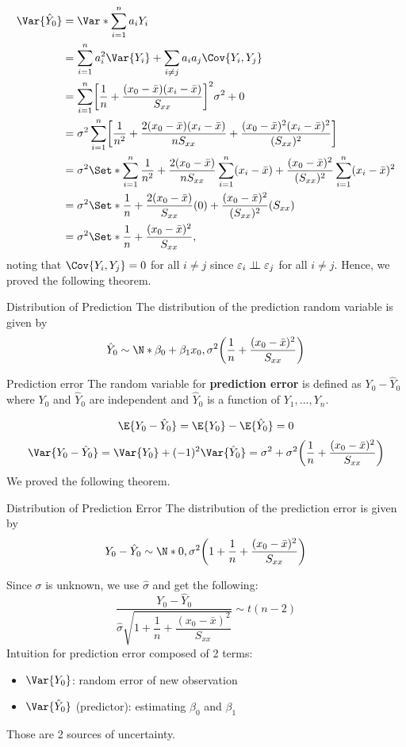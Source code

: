 \begin{align*}
  \Var{\hat{Y}_0}
   & =\Var*{\sum_{i=1}^{n}a_i Y_i}                                    \\
   & =\sum_{i=1}^{n}a_i^2\Var{Y_i}+\sum_{i\ne j}a_i a_j\Cov{Y_i,Y_j}  \\
   & =\sum_{i=1}^{n} \biggl[ \frac{1}{n} +
  \frac{(x_0-\bar{x})(x_i-\bar{x})}{S_{xx}} \biggr]^2\sigma^2+0       \\
   & = \sigma^2\sum_{i=1}^{n} \biggl[ \frac{1}{n^2}+
    \frac{2(x_0-\bar{x})(x_i-\bar{x})}{nS_{xx}}+
  \frac{(x_0-\bar{x})^2(x_i-\bar{x})^2}{(S_{xx})^2}  \biggr]          \\
   & =\sigma^2\Set*{\sum_{i=1}^{n} \frac{1}{n^2}+
    \frac{2(x_0-\bar{x})}{n S_{xx}}\sum_{i=1}^{n} (x_i-\bar{x})
  +\frac{(x_0-\bar{x})^2}{(S_{xx})^2} \sum_{i=1}^{n} (x_i-\bar{x})^2} \\
   & =\sigma^2\Set*{\frac{1}{n} +\frac{2(x_0-\bar{x})}{S_{xx}}(0)+
  \frac{(x_0-\bar{x})^2}{(S_{xx})^2}(S_{xx})}                         \\
   & =\sigma^2\Set*{\frac{1}{n}+\frac{(x_0-\bar{x})^2}{S_{xx}}},
\end{align*}
noting that $ \Cov{Y_i,Y_j}=0 $ for all $ i\ne j $ since $ \varepsilon_i\perp\!\!\!\perp \varepsilon_j $ for all $ i\ne j $. Hence,
we proved the following theorem.
\begin{Theorem}{Distribution of Prediction}{}
  The distribution of the prediction random variable is given by
  \[ \hat{Y}_0 \sim \N*{\beta_0+\beta_1x_0,
      \sigma^2\biggl( \frac{1}{n} +\frac{(x_0-\bar{x})^2}{S_{xx}}  \biggr)} \]
\end{Theorem}
\begin{Definition}{Prediction error}{}
  The random variable for \textbf{prediction error} is defined as
  $ Y_0-\hat{Y}_0 $
  where $ Y_0 $ and $ \hat{Y}_0 $ are independent
  and $ \hat{Y}_0 $ is a function of $ Y_1,\ldots,Y_n $.
\end{Definition}
\[ \E{Y_0-\hat{Y}_0}=\E{Y_0}-\E{\hat{Y}_0}=0 \]
\[ \Var{Y_0-\hat{Y}_0}=\Var{Y_0}+(-1)^2\Var{\hat{Y}_0}
  =\sigma^2+\sigma^2\biggl(\frac{1}{n} +\frac{(x_0-\bar{x})^2}{S_{xx}} \biggr)
\]
We proved the following theorem.
\begin{Theorem}{Distribution of Prediction Error}{}
  The distribution of the prediction error is given by
  \[ Y_0-\hat{Y}_0
    \sim \N*{0,\sigma^2\biggl( 1+\frac{1}{n}+\frac{(x_0-\bar{x})^2}{S_{xx}}  \biggr)} \]
\end{Theorem}
Since $ \sigma $ is unknown, we use $ \hat{\sigma} $ and get the following:
\[ \frac{Y_0-\hat{Y}_0}{
    \hat{\sigma}\sqrt{1+\dfrac{1}{n}+\dfrac{(x_0-\bar{x})^2}{S_{xx}}}
  } \sim t(n-2) \]
Intuition for prediction error composed of 2 terms:
\begin{itemize}
  \item $ \Var{Y_0} $: random error of new observation
  \item $ \Var{\hat{Y}_0} $ (predictor): estimating $ \beta_0 $ and $ \beta_1 $
\end{itemize}
Those are 2 sources of uncertainty.

